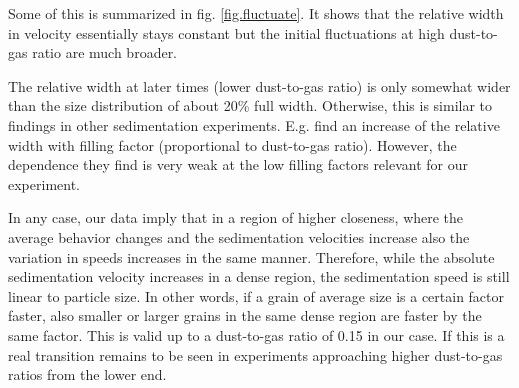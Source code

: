{Some of this is summarized in fig. \ref{fig.fluctuate}.}
It shows that the relative width in velocity essentially stays constant but the initial fluctuations at high dust-to-gas ratio are much broader. {The relative width at later times (lower dust-to-gas ratio) is only somewhat wider than the size distribution of about 20\% full width. Otherwise, this is similar to findings in other sedimentation experiments. E.g. \citet{guazzelli2011} find 
an increase of the relative width with filling factor (proportional to dust-to-gas ratio). However, the dependence they find is very weak at the low filling factors relevant for our experiment. 

In any case, our data imply that in a region of higher closeness, where the average behavior changes and the sedimentation velocities increase also the variation in speeds increases in the same manner. {Therefore, while the absolute sedimentation velocity increases in a dense region, the sedimentation speed is still linear to particle size. In other words, if a grain of average size is a certain factor faster, also smaller or larger grains in the same dense region are faster by the same factor.} This is valid up to a dust-to-gas ratio of 0.15 in our case. If this is a real transition remains to be seen in experiments approaching higher dust-to-gas ratios from the lower end.}

